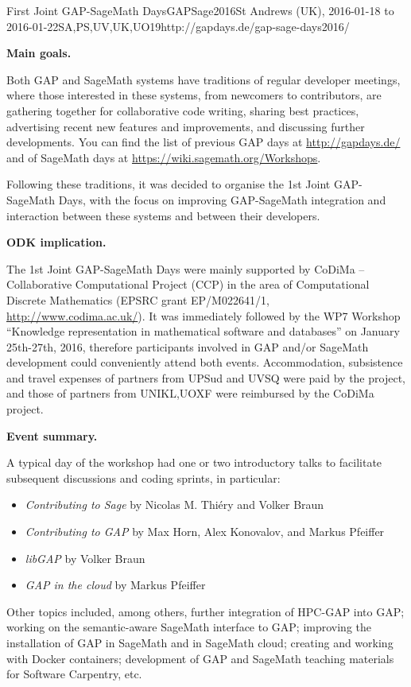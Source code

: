 \begin{event}{First Joint GAP-SageMath Days}{GAPSage2016}{St Andrews (UK),
2016-01-18 to 2016-01-22}{SA,PS,UV,UK,UO}{19}{http://gapdays.de/gap-sage-days2016/}

\textbf{Main goals.}

Both GAP and SageMath systems have traditions of regular developer meetings, where those
interested in these systems, from newcomers to contributors, are gathering together for
collaborative code writing, sharing best practices, advertising recent new features and
improvements, and discussing further developments. You can find the list of previous GAP 
days at \url{http://gapdays.de/} and of SageMath days at \url{https://wiki.sagemath.org/Workshops}.

Following these traditions, it was decided to organise the 1st Joint GAP-SageMath Days, with the
focus on improving GAP-SageMath integration and interaction between these systems and between
their developers.

\textbf{ODK implication.} 

The 1st Joint GAP-SageMath Days were mainly supported by CoDiMa -- Collaborative Computational
Project (CCP) in the area of Computational Discrete Mathematics (EPSRC grant EP/M022641/1,
\url{http://www.codima.ac.uk/}). It was immediately followed by the WP7 Workshop ``Knowledge
representation in mathematical software and databases'' on January 25th-27th, 2016, therefore
\ODK participants involved in GAP and/or SageMath development could conveniently attend
both events. Accommodation, subsistence and travel expenses of partners from UPSud and UVSQ
were paid by the \ODK project, and those of partners from UNIKL,UOXF were reimbursed
by the CoDiMa project.

\textbf{Event summary.} 

A typical day of the workshop had one or two introductory talks to facilitate subsequent
discussions and coding sprints, in particular:
\begin{itemize}
\item \emph{Contributing to Sage} by Nicolas M. Thiéry and Volker Braun
\item \emph{Contributing to GAP } by Max Horn, Alex Konovalov, and Markus Pfeiffer
\item \emph{libGAP} by Volker Braun
\item \emph{GAP in the cloud} by Markus Pfeiffer
\end{itemize}
Other topics included, among others,
further integration of HPC-GAP into GAP;
working on the semantic-aware SageMath interface to GAP;
improving the installation of GAP in SageMath and in SageMath cloud;
creating and working with Docker containers;
development of GAP and SageMath teaching materials for Software Carpentry,
etc.


\end{event}
